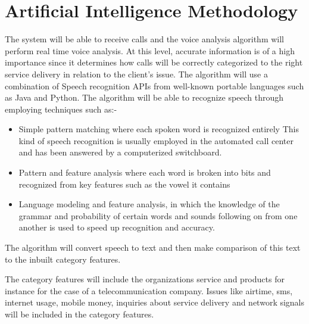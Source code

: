 \documentclass[conference]{IEEEtran}
\begin{document}
\section{Artificial Intelligence Methodology}
The system will be able to receive calls and the voice analysis algorithm will perform real time voice analysis. At this level, accurate information is of a high importance since it determines how calls will be correctly categorized to the right service delivery in relation to the client’s issue. The algorithm will use a combination of Speech recognition APIs from well-known portable languages such as Java and Python. The algorithm will be able to recognize speech through employing techniques such as:-
\begin{itemize}
\item Simple pattern matching where each spoken word is recognized entirely
This kind of speech recognition is usually employed in the automated call center and has been answered by a computerized switchboard.
\item 	Pattern and feature analysis where each word is broken into bits and recognized from key features such as the vowel it contains
\item Language modeling and feature analysis, in which the knowledge of the grammar and probability of certain words and sounds following on from one another is used to speed up recognition and accuracy.
\end{itemize}
The algorithm will convert speech to text and then make comparison of this text to the inbuilt category features.

The category features will include the organizations service and products for instance for the case of a telecommunication company. Issues like airtime, sms, internet usage, mobile money, inquiries about service delivery and network signals will be included in the category features.
\end{document}
